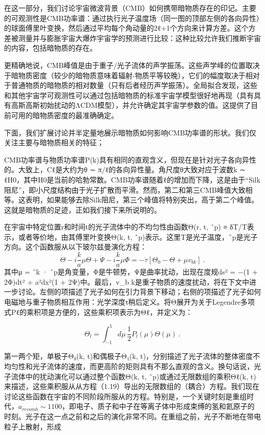 


在这一部分，我们讨论宇宙微波背景（CMB）如何携带暗物质存在的印记。主要的可观测性是CMB功率谱：通过执行光子温度场（同一图的顶部左侧的各向异性）的球面傅里叶变换，然后通过平均每个角动量的2ℓ+1个方向来计算方差。这个方差被测量并与膨胀宇宙大爆炸宇宙学的预测进行比较：这种比较允许我们推断宇宙的内容，包括暗物质的存在。

更精确地说，CMB峰值是由于重子/光子流体的声学振荡。这些声学峰的位置取决于暗物质密度（较少的暗物质意味着辐射-物质平等较晚），它们的幅度取决于相对于普通物质的暗物质的相对数量（只有后者经历声学振荡）。全局拟合发现，这些和其他宇宙学可观测性可以通过包括暗物质的标准宇宙学模型很好地再现（具有具有高斯高斯初始扰动的ΛCDM模型），并允许确定其宇宙学参数的值。这提供了目前可用的暗物质密度的最准确确定。

下面，我们扩展讨论并半定量地展示暗物质如何影响CMB功率谱的形状。我们仅关注主要与暗物质相关的特征； 

CMB功率谱与物质功率谱P(k)具有相同的直观含义，但现在是针对光子各向异性的。大致上，Cℓ是大约为θ ∼ π/ℓ的各向异性量。角尺度θ大致对应于波数k ∼ ℓH0，其中H0是当前的哈勃常数。CMB功率谱随着ℓ的增加而下降，这是由于“Silk阻尼”，即小尺度结构由于光子扩散而平滑。然而，第二和第三CMB峰值大致相等。这表明，如果能够去除Silk阻尼，第三个峰值将特别突出，高于第二个峰值。这就是暗物质的足迹，正如我们接下来所说明的。

在宇宙中特定位置r和时间t的光子流体中的不均匀性由函数Θ(r, t, ˆp) ≡ δT/T表示，或者等价地，由其傅里叶变换Θ(k, t, ˆp)表示。这里T是光子温度，ˆp是光子方向。这个函数服从以下玻尔兹曼演化方程：
\[ \dot{\Theta} - i \frac{k}{a}\mu  \Theta + \dot{\Psi} - i \frac{k}{a} \mu  \Phi = - \dot{\tau}[\Theta_0 - \Theta + \mu v_{b k}]~. \]
其中μ = ˆk · ˆp是角变量，Φ是牛顿势，Ψ是曲率扰动，出现在度规ds² = −(1 + 2Φ)dt² + a²dx²(1 + 2Ψ)中。最后，v_b k是重子物质的速度扰动，将在下文中进一步讨论。左侧的项描述了光子如何在引力背景下移动；右侧的项描述了光子如何电磁地与重子物质相互作用：光学深度τ稍后定义。将Θ展开为关于Legendre多项式Pℓ的乘积项是方便的，这些乘积项表示为Θℓ，并定义为：

\[ \Theta_l = \int_{-1}^{1} d\mu \, \frac{1}{2} P_l(\mu) \Theta(\mu)~. \]

第一两个矩，单极子Θ₀(k, t)和偶极子Θ₁(k, t)，分别描述了光子流体的整体密度不均匀性和光子流体的速度，而更高阶的矩则具有不那么直观的含义。换句话说，光子流体中的扰动演化可以通过整个函数Θ(k, t, ˆp)或通过无限数组的乘积Θℓ(k, t)来描述，这些乘积服从从方程（1.19）导出的无限数组的（耦合）方程。我们现在讨论这些函数在宇宙的不同阶段所服从的方程。特别是，一个关键时刻是重组时代，$a_{recomb} \sim 1100$，即电子、质子和中子在等离子体中形成束缚的氢和氦原子的时刻。光子在这一点之前和之后的演化非常不同。在重组之前，光子不断地在带电粒子上散射，形成



